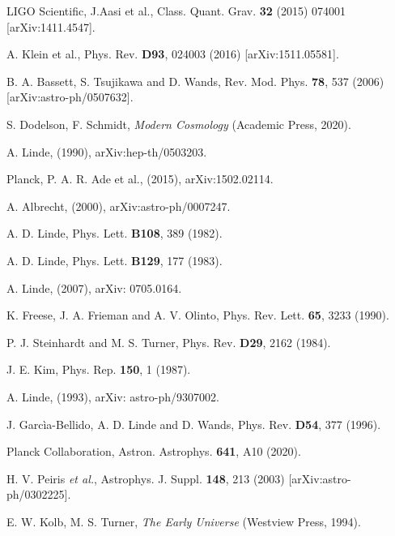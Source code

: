 \documentclass[11pt,a4paper,twoside]{book}
\begin{document}
\begin{thebibliography}{2}
	 LIGO Scientific, J.Aasi et al., Class. Quant. Grav. \textbf{32} (2015) 074001 [arXiv:1411.4547].
	
	 A. Klein et al., Phys. Rev. \textbf{D93}, 024003 (2016) [arXiv:1511.05581].
	
	 B. A. Bassett, S. Tsujikawa and D. Wands, Rev. Mod. Phys. \textbf{78}, 537 (2006) [arXiv:astro-ph/0507632].
	
	 S. Dodelson, F. Schmidt, \emph{Modern Cosmology} (Academic Press, 2020).
	
	 A. Linde,  (1990), arXiv:hep-th/0503203.
	
	 Planck, P. A. R. Ade et al., (2015), arXiv:1502.02114.
	
	 A. Albrecht, (2000), arXiv:astro-ph/0007247.
	
	 A. D. Linde, Phys. Lett. \textbf{B108}, 389 (1982).
	
	 A. D. Linde, Phys. Lett. \textbf{B129}, 177  (1983).  
	
	 A. Linde, (2007), arXiv: 0705.0164. 
	
	 K. Freese, J. A. Frieman and A. V. Olinto, Phys. Rev. Lett. \textbf{65}, 3233 (1990).
	
	 P. J. Steinhardt and M. S. Turner, Phys. Rev. \textbf{D29}, 2162 (1984).
	
	 J. E. Kim, Phys. Rep. \textbf{150}, 1 (1987).
	
	 A. Linde, (1993), arXiv: astro-ph/9307002.
	
	 J. Garcìa-Bellido, A. D. Linde and D. Wands, Phys. Rev. \textbf{D54}, 377 (1996).
	
	 Planck Collaboration, Astron. Astrophys. \textbf{641}, A10 (2020).
	
	 H. V. Peiris \textit{et al.}, Astrophys. J. Suppl. \textbf{148}, 213 (2003) [arXiv:astro-ph/0302225].
	
	 E. W. Kolb, M. S. Turner, \textit{The Early Universe} (Westview Press, 1994).
	
	
		
\end{thebibliography}	
	
\end{document}
